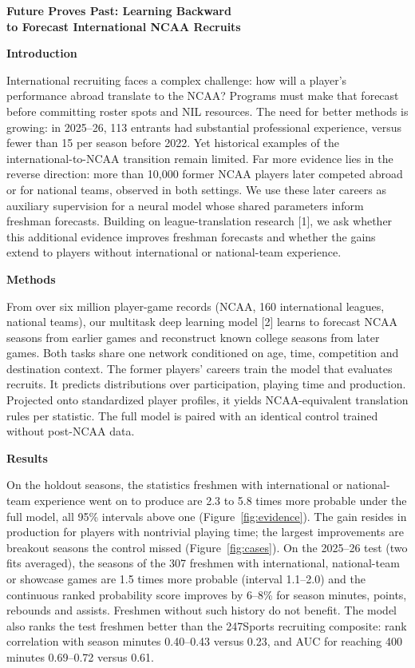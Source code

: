 \documentclass[11pt,letterpaper]{article}
\author{Aaron John Danielson\textsuperscript{1,*}\quad Denis Beausoleil\quad Hasan Alanam\\
\textsuperscript{1}Department of Computer Science, The University of Texas at Austin\\
\textsuperscript{*}Corresponding author: \href{mailto:aaron.danielson@austin.utexas.edu}{aaron.danielson@austin.utexas.edu}}
\newcommand{\abstractsection}[1]{\par\vspace{3pt}\noindent\textbf{#1}\par\nobreak}
\begin{document}
\begin{center}
{\large\bfseries Future Proves Past: Learning Backward\\
to Forecast International NCAA Recruits}
\par\vspace{5pt}
{\small\makeatletter\@author\makeatother}
\end{center}
\vspace{-10pt}

\abstractsection{Introduction}
International recruiting faces a complex challenge: how will a player's performance abroad translate to the NCAA? Programs must make that forecast before committing roster spots and NIL resources. The need for better methods is growing: in 2025--26, 113 entrants had substantial professional experience, versus fewer than 15 per season before 2022. Yet historical examples of the international-to-NCAA transition remain limited. Far more evidence lies in the reverse direction: more than 10,000 former NCAA players later competed abroad or for national teams, observed in both settings. We use these later careers as auxiliary supervision for a neural model whose shared parameters inform freshman forecasts. Building on league-translation research [1], we ask whether this additional evidence improves freshman forecasts and whether the gains extend to players without international or national-team experience.

\abstractsection{Methods}
From over six million player-game records (NCAA, 160 international leagues, national teams), our multitask deep learning model [2] learns to forecast NCAA seasons from earlier games and reconstruct known college seasons from later games. Both tasks share one network conditioned on age, time, competition and destination context. The former players' careers train the model that evaluates recruits. It predicts distributions over participation, playing time and production. Projected onto standardized player profiles, it yields NCAA-equivalent translation rules per statistic. The full model is paired with an identical control trained without post-NCAA data.

\abstractsection{Results}
On the holdout seasons, the statistics freshmen with international or national-team experience went on to produce are 2.3 to 5.8 times more probable under the full model, all 95\% intervals above one (Figure~\ref{fig:evidence}). The gain resides in production for players with nontrivial playing time; the largest improvements are breakout seasons the control missed (Figure~\ref{fig:cases}). On the 2025--26 test (two fits averaged), the seasons of the 307 freshmen with international, national-team or showcase games are 1.5 times more probable (interval 1.1--2.0) and the continuous ranked probability score improves by 6--8\% for season minutes, points, rebounds and assists. Freshmen without such history do not benefit. The model also ranks the test freshmen better than the 247Sports recruiting composite: rank correlation with season minutes 0.40--0.43 versus 0.23, and AUC for reaching 400 minutes 0.69--0.72 versus 0.61.
\end{document}
